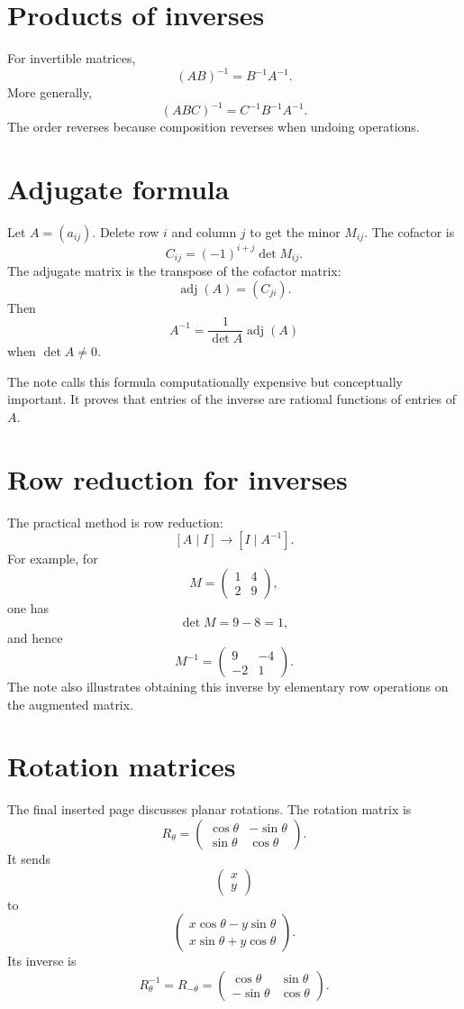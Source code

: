 \section{Products of inverses}

For invertible matrices,
\[
  (AB)^{-1}=B^{-1}A^{-1}.
\]
More generally,
\[
  (ABC)^{-1}=C^{-1}B^{-1}A^{-1}.
\]
The order reverses because composition reverses when undoing operations.

\section{Adjugate formula}

Let \(A=(a_{ij})\).  Delete row \(i\) and column \(j\) to get the minor \(M_{ij}\).  The cofactor is
\[
  C_{ij}=(-1)^{i+j}\det M_{ij}.
\]
The adjugate matrix is the transpose of the cofactor matrix:
\[
  \operatorname{adj}(A)=(C_{ji}).
\]
Then
\[
  A^{-1}=\frac1{\det A}\operatorname{adj}(A)
\]
when \(\det A\neq0\).

The note calls this formula computationally expensive but conceptually important.  It proves that entries of the inverse are rational functions of entries of \(A\).

\section{Row reduction for inverses}

The practical method is row reduction:
\[
  [A\mid I]\longrightarrow [I\mid A^{-1}].
\]
For example, for
\[
  M=\begin{pmatrix}1&4\\2&9\end{pmatrix},
\]
one has
\[
  \det M=9-8=1,
\]
and hence
\[
  M^{-1}=\begin{pmatrix}9&-4\\-2&1\end{pmatrix}.
\]
The note also illustrates obtaining this inverse by elementary row operations on the augmented matrix.

\section{Rotation matrices}

The final inserted page discusses planar rotations.  The rotation matrix is
\[
  R_\theta=
  \begin{pmatrix}
  \cos\theta&-\sin\theta\\
  \sin\theta&\cos\theta
  \end{pmatrix}.
\]
It sends
\[
  \begin{pmatrix}x\\y\end{pmatrix}
\]
to
\[
  \begin{pmatrix}
  x\cos\theta-y\sin\theta\\
  x\sin\theta+y\cos\theta
  \end{pmatrix}.
\]
Its inverse is
\[
  R_\theta^{-1}=R_{-\theta}=
  \begin{pmatrix}
  \cos\theta&\sin\theta\\
  -\sin\theta&\cos\theta
  \end{pmatrix}.
\]

